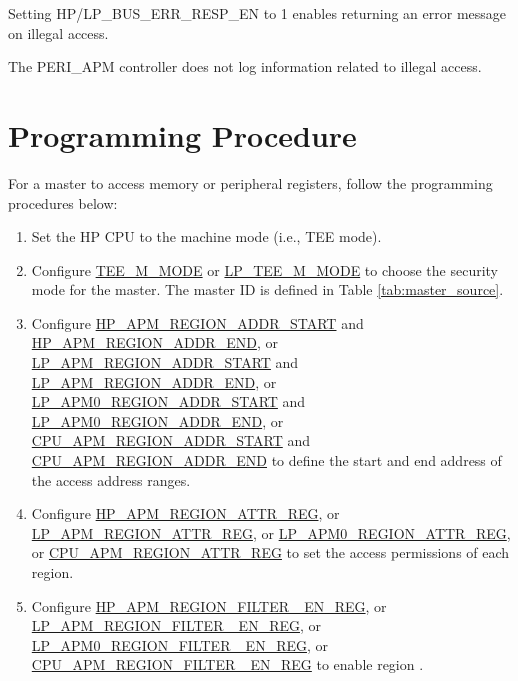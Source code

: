 \documentclass[main\_\_EN.tex]{subfiles}
\begin{document}
Setting HP/LP\_BUS\_ERR\_RESP\_EN to 1 enables returning an error message on illegal access.

The PERI\_APM controller does not log information related to illegal access.

\section{Programming Procedure}

For a master to access memory or peripheral registers, follow the programming procedures below:

\begin{enumerate}

    \item Set the HP CPU to the machine mode (i.e., TEE mode).
    \item Configure \hyperref[fielddesc:TEEMNMODE]{TEE\_M\_MODE} or \hyperref[fielddesc:LPTEEM0MODE]{LP\_TEE\_M\_MODE} to choose the security mode for the master. The master ID  is defined in Table \ref{tab:master_source}.

    \item Configure \hyperref[regdesc:HPAPMREGIONNADDRSTARTREG]{HP\_APM\_REGION\_ADDR\_START} and \hyperref[regdesc:HPAPMREGIONNADDRENDREG]{HP\_APM\_REGION\_ADDR\_END}, or \hyperref[regdesc:LPAPMREGIONNADDRSTARTREG]{LP\_APM\_REGION\_ADDR\_START} and \hyperref[regdesc:LPAPMREGIONNADDRENDREG]{LP\_APM\_REGION\_ADDR\_END}, or \hyperref[regdesc:LPAPM0REGIONNADDRSTARTREG]{LP\_APM0\_REGION\_ADDR\_START} and \hyperref[regdesc:LPAPM0REGIONNADDRENDREG]{LP\_APM0\_REGION\_ADDR\_END}, or \hyperref[regdesc:CPUAPMREGIONNADDRSTARTREG]{CPU\_APM\_REGION\_ADDR\_START} and \hyperref[regdesc:CPUAPMREGIONNADDRENDREG]{CPU\_APM\_REGION\_ADDR\_END} to define the start and end address of the access address ranges.

    \item Configure \hyperref[regdesc:HPAPMREGIONNATTRREG]{HP\_APM\_REGION\_ATTR\_REG}, or \hyperref[regdesc:LPAPMREGIONNATTRREG]{LP\_APM\_REGION\_ATTR\_REG}, or \hyperref[regdesc:LPAPM0REGIONNATTRREG]{LP\_APM0\_REGION\_ATTR\_REG}, or \hyperref[regdesc:CPUAPMREGIONNATTRREG]{CPU\_APM\_REGION\_ATTR\_REG} to set the access permissions of each region.


    \item Configure \hyperref[fielddesc:HPAPMREGIONFILTEREN]{HP\_APM\_REGION\_FILTER\_ EN\_REG}, or \hyperref[fielddesc:LPAPMREGIONFILTEREN]{LP\_APM\_REGION\_FILTER\_ EN\_REG}, or \hyperref[fielddesc:LPAPM0REGIONFILTEREN]{LP\_APM0\_REGION\_FILTER\_ EN\_REG}, or \hyperref[fielddesc:CPUAPMREGIONFILTEREN]{CPU\_APM\_REGION\_FILTER\_ EN\_REG} to enable region .


\end{enumerate}
\end{document}
